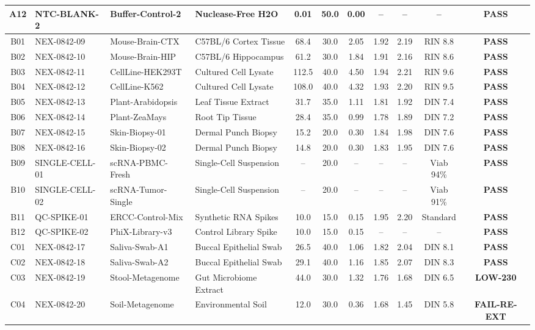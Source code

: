 \documentclass[10pt,a4paper]{article}
\newcommand{\statusbadge}[2]{%
  \setlength{\fboxsep}{2pt}%
  \colorbox{#1!15!white}{\color{#1}\fontsize{6.5pt}{7.5pt}\selectfont\textbf{#2}}%
}
\begin{document}
\begin{tabularx}{\linewidth}{@{} c l l X c c c c c c c @{}}
  A12 & NTC-BLANK-2 & Buffer-Control-2 & Nuclease-Free H2O & 0.01 & 50.0 & 0.00 & -- & -- & -- & \statusbadge{PassGreen}{PASS} \\
  \hline
  B01 & NEX-0842-09 & Mouse-Brain-CTX & C57BL/6 Cortex Tissue & 68.4 & 30.0 & 2.05 & 1.92 & 2.19 & RIN 8.8 & \statusbadge{PassGreen}{PASS} \\
  B02 & NEX-0842-10 & Mouse-Brain-HIP & C57BL/6 Hippocampus & 61.2 & 30.0 & 1.84 & 1.91 & 2.16 & RIN 8.6 & \statusbadge{PassGreen}{PASS} \\
  B03 & NEX-0842-11 & CellLine-HEK293T & Cultured Cell Lysate & 112.5 & 40.0 & 4.50 & 1.94 & 2.21 & RIN 9.6 & \statusbadge{PassGreen}{PASS} \\
  B04 & NEX-0842-12 & CellLine-K562 & Cultured Cell Lysate & 108.0 & 40.0 & 4.32 & 1.93 & 2.20 & RIN 9.5 & \statusbadge{PassGreen}{PASS} \\
  B05 & NEX-0842-13 & Plant-Arabidopsis & Leaf Tissue Extract & 31.7 & 35.0 & 1.11 & 1.81 & 1.92 & DIN 7.4 & \statusbadge{PassGreen}{PASS} \\
  B06 & NEX-0842-14 & Plant-ZeaMays & Root Tip Tissue & 28.4 & 35.0 & 0.99 & 1.78 & 1.89 & DIN 7.2 & \statusbadge{PassGreen}{PASS} \\
  B07 & NEX-0842-15 & Skin-Biopsy-01 & Dermal Punch Biopsy & 15.2 & 20.0 & 0.30 & 1.84 & 1.98 & DIN 7.6 & \statusbadge{PassGreen}{PASS} \\
  B08 & NEX-0842-16 & Skin-Biopsy-02 & Dermal Punch Biopsy & 14.8 & 20.0 & 0.30 & 1.83 & 1.95 & DIN 7.6 & \statusbadge{PassGreen}{PASS} \\
  B09 & SINGLE-CELL-01 & scRNA-PBMC-Fresh & Single-Cell Suspension & -- & 20.0 & -- & -- & -- & Viab 94\% & \statusbadge{PassGreen}{PASS} \\
  B10 & SINGLE-CELL-02 & scRNA-Tumor-Single & Single-Cell Suspension & -- & 20.0 & -- & -- & -- & Viab 91\% & \statusbadge{PassGreen}{PASS} \\
  B11 & QC-SPIKE-01 & ERCC-Control-Mix & Synthetic RNA Spikes & 10.0 & 15.0 & 0.15 & 1.95 & 2.20 & Standard & \statusbadge{PassGreen}{PASS} \\
  B12 & QC-SPIKE-02 & PhiX-Library-v3 & Control Library Spike & 10.0 & 15.0 & 0.15 & -- & -- & -- & \statusbadge{PassGreen}{PASS} \\
  \hline
  C01 & NEX-0842-17 & Saliva-Swab-A1 & Buccal Epithelial Swab & 26.5 & 40.0 & 1.06 & 1.82 & 2.04 & DIN 8.1 & \statusbadge{PassGreen}{PASS} \\
  C02 & NEX-0842-18 & Saliva-Swab-A2 & Buccal Epithelial Swab & 29.1 & 40.0 & 1.16 & 1.85 & 2.07 & DIN 8.3 & \statusbadge{PassGreen}{PASS} \\
  C03 & NEX-0842-19 & Stool-Metagenome & Gut Microbiome Extract & 44.0 & 30.0 & 1.32 & 1.76 & 1.68 & DIN 6.5 & \statusbadge{WarnAmber}{LOW-230} \\
  C04 & NEX-0842-20 & Soil-Metagenome & Environmental Soil & 12.0 & 30.0 & 0.36 & 1.68 & 1.45 & DIN 5.8 & \statusbadge{FailRed}{FAIL-RE-EXT} \\
  \bottomrule
\end{tabularx}
\end{document}
